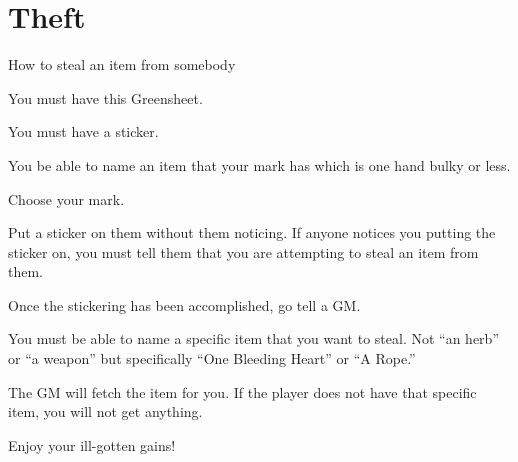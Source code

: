 \documentclass[green]{guildcamp2}
\begin{document}
\name{\gTheft{}}

\section{Theft}
How to steal an item from somebody

\begin{enum}[Requirements]
	\item You must have this Greensheet.
	\item You must have a sticker.
	\item You be able to name an item that your mark has which is one hand bulky or less.
\end{enum}

\begin{enum}[Directions]
	\item Choose your mark.
	\item Put a sticker on them without them noticing. If anyone notices you putting the sticker on, you must tell them that you are attempting to steal an item from them.
	\item Once the stickering has been accomplished, go tell a GM.
	\item You must be able to name a specific item that you want to steal. Not ``an herb'' or ``a weapon'' but specifically ``One Bleeding Heart'' or ``A Rope.''
	\item The GM will fetch the item for you. If the player does not have that specific item, you will not get anything.
	\item Enjoy your ill-gotten gains!	
\end{enum}
	
\end{document}

